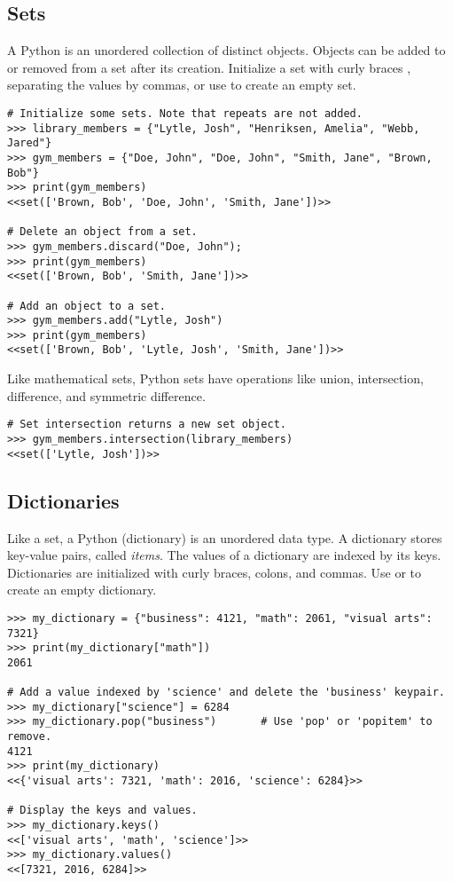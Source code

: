 \subsection*{Sets} %

A Python  is an unordered collection of distinct objects.
Objects can be added to or removed from a set after its creation.
Initialize a set with curly braces \li{\{ \}}, separating the values by commas, or use  to create an empty set.

\begin{lstlisting}
# Initialize some sets. Note that repeats are not added.
>>> library_members = {"Lytle, Josh", "Henriksen, Amelia", "Webb, Jared"}
>>> gym_members = {"Doe, John", "Doe, John", "Smith, Jane", "Brown, Bob"}
>>> print(gym_members)
<<set(['Brown, Bob', 'Doe, John', 'Smith, Jane'])>>

# Delete an object from a set.
>>> gym_members.discard("Doe, John");
>>> print(gym_members)
<<set(['Brown, Bob', 'Smith, Jane'])>>

# Add an object to a set.
>>> gym_members.add("Lytle, Josh")
>>> print(gym_members)
<<set(['Brown, Bob', 'Lytle, Josh', 'Smith, Jane'])>>
\end{lstlisting}

Like mathematical sets, Python sets have operations like union, intersection, 
difference, and symmetric difference.
\begin{lstlisting}
# Set intersection returns a new set object.
>>> gym_members.intersection(library_members)
<<set(['Lytle, Josh'])>>
\end{lstlisting}

\subsection*{Dictionaries} %

Like a set, a Python  (dictionary) is an unordered data type.
A dictionary stores key-value pairs, called \emph{items}.
The values of a dictionary are indexed by its keys.
Dictionaries are initialized with curly braces, colons, and commas.
Use  or \li{\{\}} to create an empty dictionary.

\begin{lstlisting}
>>> my_dictionary = {"business": 4121, "math": 2061, "visual arts": 7321} 
>>> print(my_dictionary["math"])
2061

# Add a value indexed by 'science' and delete the 'business' keypair.
>>> my_dictionary["science"] = 6284
>>> my_dictionary.pop("business")       # Use 'pop' or 'popitem' to remove.
4121
>>> print(my_dictionary)
<<{'visual arts': 7321, 'math': 2016, 'science': 6284}>>

# Display the keys and values.
>>> my_dictionary.keys()
<<['visual arts', 'math', 'science']>>
>>> my_dictionary.values()
<<[7321, 2016, 6284]>>
\end{lstlisting}

